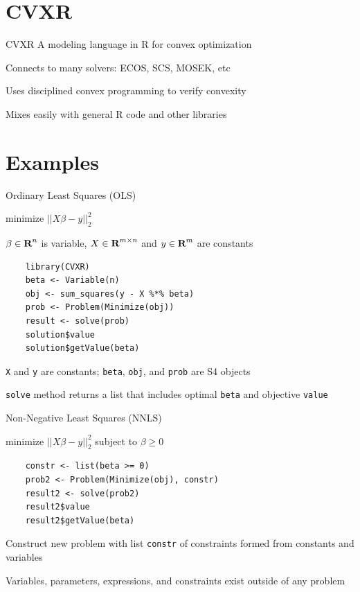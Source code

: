 \documentclass{beamer}
\begin{document}
\section{CVXR}

\begin{frame}{CVXR}
	A modeling language in R for convex optimization
	
	\BIT
		\item Connects to many solvers: ECOS, SCS, MOSEK, etc
		\item Uses disciplined convex programming to 
verify convexity
		\item Mixes easily with general R code and other libraries
	\EIT
\end{frame}

\section{Examples}

\begin{frame}[fragile]{Ordinary Least Squares (OLS)}
	\BIT
		\item minimize $||X\beta - y||_2^2$
		\item $\beta \in {\mbox{\bf R}}^n$ is variable, $X \in {\mbox{\bf R}}^{m \times n}$ and $y \in {\mbox{\bf R}}^m$ are constants
	\EIT
	
	\pause
	\begin{verbatim}
	library(CVXR)
	beta <- Variable(n)
	obj <- sum_squares(y - X %*% beta)
	prob <- Problem(Minimize(obj))
	result <- solve(prob)
	solution$value
	solution$getValue(beta)
	\end{verbatim}
	
	\BIT
		\item \verb|X| and \verb|y| are constants; \verb|beta|, \verb|obj|, and \verb|prob| are S4 objects
		\item \verb|solve| method returns a list that includes optimal \verb|beta| and objective \verb|value|
	\EIT
\end{frame}

\begin{frame}[fragile]{Non-Negative Least Squares (NNLS)}
	\BIT
	\item minimize $||X\beta - y||_2^2$ subject to $\beta \geq 0$
	\EIT
	\pause
	\begin{verbatim}
	constr <- list(beta >= 0)
	prob2 <- Problem(Minimize(obj), constr)
	result2 <- solve(prob2)
	result2$value
	result2$getValue(beta)
	\end{verbatim}
	
	\BIT
		\item Construct new problem with list \verb|constr| of constraints formed from constants and variables
		\item Variables, parameters, expressions, and constraints exist outside of any problem
	\EIT
\end{frame}
\end{document}
